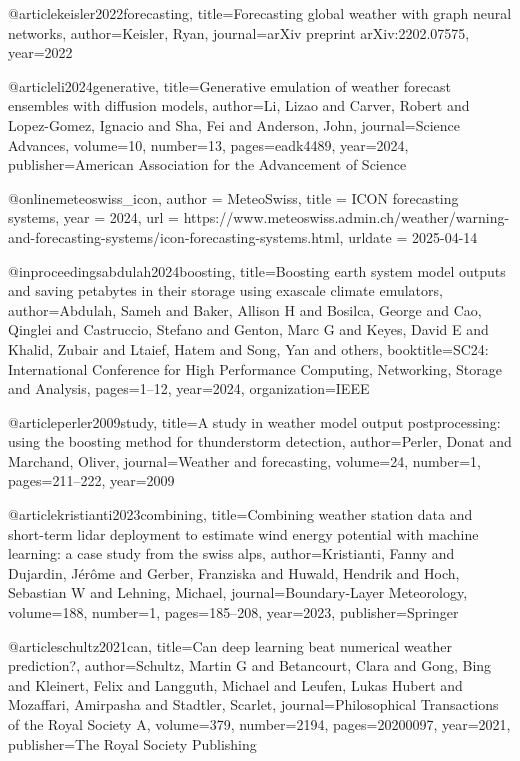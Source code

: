 @article{keisler2022forecasting,
  title={Forecasting global weather with graph neural networks},
  author={Keisler, Ryan},
  journal={arXiv preprint arXiv:2202.07575},
  year={2022}
}

@article{li2024generative,
  title={Generative emulation of weather forecast ensembles with diffusion models},
  author={Li, Lizao and Carver, Robert and Lopez-Gomez, Ignacio and Sha, Fei and Anderson, John},
  journal={Science Advances},
  volume={10},
  number={13},
  pages={eadk4489},
  year={2024},
  publisher={American Association for the Advancement of Science}
}

@online{meteoswiss_icon,
  author       = {{MeteoSwiss}},
  title        = {ICON forecasting systems},
  year         = 2024,
  url          = {https://www.meteoswiss.admin.ch/weather/warning-and-forecasting-systems/icon-forecasting-systems.html},
  urldate      = {2025-04-14}
}

@inproceedings{abdulah2024boosting,
  title={Boosting earth system model outputs and saving petabytes in their storage using exascale climate emulators},
  author={Abdulah, Sameh and Baker, Allison H and Bosilca, George and Cao, Qinglei and Castruccio, Stefano and Genton, Marc G and Keyes, David E and Khalid, Zubair and Ltaief, Hatem and Song, Yan and others},
  booktitle={SC24: International Conference for High Performance Computing, Networking, Storage and Analysis},
  pages={1--12},
  year={2024},
  organization={IEEE}
}

@article{perler2009study,
  title={A study in weather model output postprocessing: using the boosting method for thunderstorm detection},
  author={Perler, Donat and Marchand, Oliver},
  journal={Weather and forecasting},
  volume={24},
  number={1},
  pages={211--222},
  year={2009}
}

@article{kristianti2023combining,
  title={Combining weather station data and short-term lidar deployment to estimate wind energy potential with machine learning: a case study from the swiss alps},
  author={Kristianti, Fanny and Dujardin, J{\'e}r{\^o}me and Gerber, Franziska and Huwald, Hendrik and Hoch, Sebastian W and Lehning, Michael},
  journal={Boundary-Layer Meteorology},
  volume={188},
  number={1},
  pages={185--208},
  year={2023},
  publisher={Springer}
}

@article{schultz2021can,
  title={Can deep learning beat numerical weather prediction?},
  author={Schultz, Martin G and Betancourt, Clara and Gong, Bing and Kleinert, Felix and Langguth, Michael and Leufen, Lukas Hubert and Mozaffari, Amirpasha and Stadtler, Scarlet},
  journal={Philosophical Transactions of the Royal Society A},
  volume={379},
  number={2194},
  pages={20200097},
  year={2021},
  publisher={The Royal Society Publishing}
}

